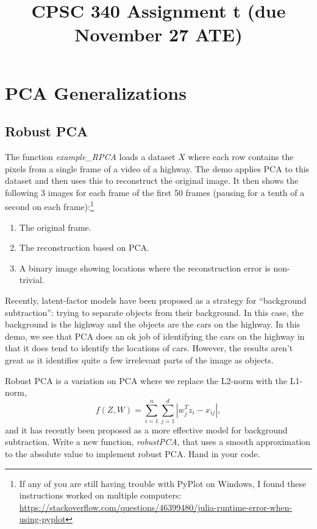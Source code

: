 \documentclass{article}
\def\blu#1{{\color{blu}#1}}
\def\enum#1{\begin{enumerate}#1\end{enumerate}}
\begin{document}
\title{CPSC 340 Assignment t (due November 27 ATE)}
\author{}
\date{}
\maketitle
\vspace{-4em}



\section{PCA Generalizations}


\subsection{Robust PCA}

The function \emph{example\_RPCA} loads a dataset $X$ where each row contains the pixels from a single frame of a video of a highway. The demo applies PCA to this dataset and then uses this to reconstruct the original image. It then shows the following 3 images for each frame of the first 50 frames (pausing for a tenth of a second on each frame):\footnote{If any of you are still having trouble with PyPlot on Windows, I found these instructions worked on multiple computers: \url{https://stackoverflow.com/questions/46399480/julia-runtime-error-when-using-pyplot}}
\enum{
\item The original frame.
\item The reconstruction based on PCA.
\item A binary image showing locations where the reconstruction error is non-trivial.
}
Recently, latent-factor models have been proposed as a strategy for ``background subtraction'': trying to separate objects from their background. In this case, the background is the highway and the objects are the cars on the highway. In this demo, we see that PCA does an ok job of identifying the cars on the highway in that it does tend to identify the locations of cars. However, the results aren't great as it identifies quite a few irrelevant parts of the image as objects.

Robust PCA is a variation on PCA where we replace the L2-norm with the L1-norm,
\[
f(Z,W) = \sum_{i=1}^n\sum_{j=1}^d |w_j^Tz_i - x_{ij}|,
\]
and it has recently been proposed as a more effective model for background subtraction. \blu{Write a new function, \emph{robustPCA}, that uses a smooth approximation to the absolute value to implement robust PCA. Hand in your code.}
\end{document}
